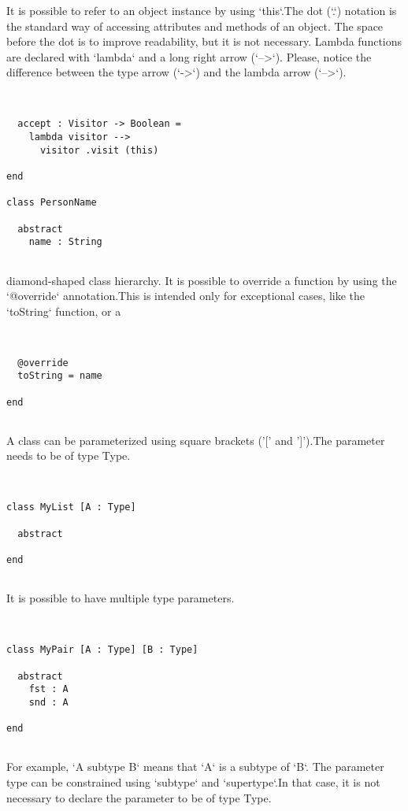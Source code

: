 \documentclass[12pt,a4paper]{article}
\begin{document}
It is possible to refer to an object instance by using `this`.The dot (`.`) notation is the standard way of accessing attributes and methods of an
object. The space before the dot is to improve readability, but it is not necessary.
Lambda functions are declared with `lambda` and a long right arrow (`-->`).
   Please, notice the difference between the type arrow (`->`) and the lambda arrow (`-->`).


\begin{lstlisting}


  accept : Visitor -> Boolean =
    lambda visitor -->
      visitor .visit (this)

end

class PersonName

  abstract
    name : String


\end{lstlisting}

diamond-shaped class hierarchy. It is possible to override a function by using the `@override` annotation.This is intended only for exceptional cases, like the `toString` function, or a


\begin{lstlisting}


  @override
  toString = name

end


\end{lstlisting}

A class can be parameterized using square brackets ('[' and ']').The parameter needs to be of type Type. 


\begin{lstlisting}


class MyList [A : Type]

  abstract

end


\end{lstlisting}

It is possible to have multiple type parameters. 


\begin{lstlisting}


class MyPair [A : Type] [B : Type]

  abstract
    fst : A
    snd : A

end


\end{lstlisting}

For example, `A subtype B` means that `A` is a subtype of `B`. The parameter type can be constrained using `subtype` and `supertype`.In that case, it is not necessary to declare the parameter to be of type Type.
\end{document}
